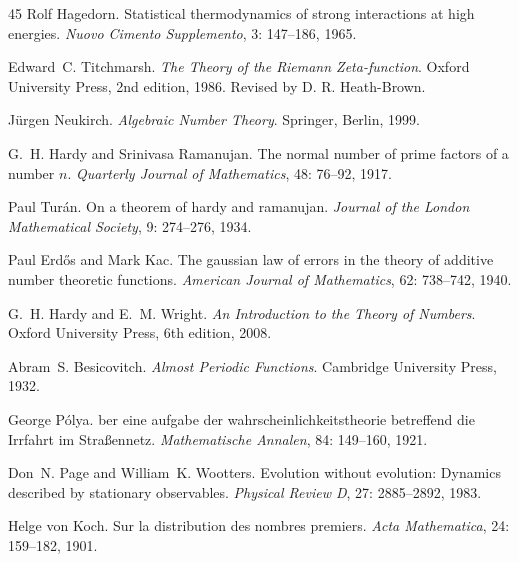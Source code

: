 \documentclass[11pt,a4paper]{article}
\theoremstyle{plain}
\theoremstyle{definition}
\theoremstyle{remark}
\begin{document}
\begin{thebibliography}{45}
Rolf Hagedorn.
\newblock Statistical thermodynamics of strong interactions at high energies.
\newblock \emph{Nuovo Cimento Supplemento}, 3: 147--186, 1965.

Edward~C. Titchmarsh.
\newblock \emph{The Theory of the Riemann Zeta-function}.
\newblock Oxford University Press, 2nd edition, 1986.
\newblock Revised by D. R. Heath-Brown.

J{\"u}rgen Neukirch.
\newblock \emph{Algebraic Number Theory}.
\newblock Springer, Berlin, 1999.

G.~H. Hardy and Srinivasa Ramanujan.
\newblock The normal number of prime factors of a number $n$.
\newblock \emph{Quarterly Journal of Mathematics}, 48: 76--92, 1917.

Paul Tur{\'a}n.
\newblock On a theorem of hardy and ramanujan.
\newblock \emph{Journal of the London Mathematical Society}, 9:
  274--276, 1934.

Paul Erd{\H o}s and Mark Kac.
\newblock The gaussian law of errors in the theory of additive number theoretic
  functions.
\newblock \emph{American Journal of Mathematics}, 62: 738--742, 1940.

G.~H. Hardy and E.~M. Wright.
\newblock \emph{An Introduction to the Theory of Numbers}.
\newblock Oxford University Press, 6th edition, 2008.

Abram~S. Besicovitch.
\newblock \emph{Almost Periodic Functions}.
\newblock Cambridge University Press, 1932.

George P{\'o}lya.
ber eine aufgabe der wahrscheinlichkeitstheorie betreffend die
  {I}rrfahrt im {S}tra{\ss}ennetz.
\newblock \emph{Mathematische Annalen}, 84: 149--160, 1921.

Don~N. Page and William~K. Wootters.
\newblock Evolution without evolution: Dynamics described by stationary
  observables.
\newblock \emph{Physical Review D}, 27: 2885--2892, 1983.

Helge von Koch.
\newblock Sur la distribution des nombres premiers.
\newblock \emph{Acta Mathematica}, 24: 159--182, 1901.


\end{thebibliography}
\end{document}
